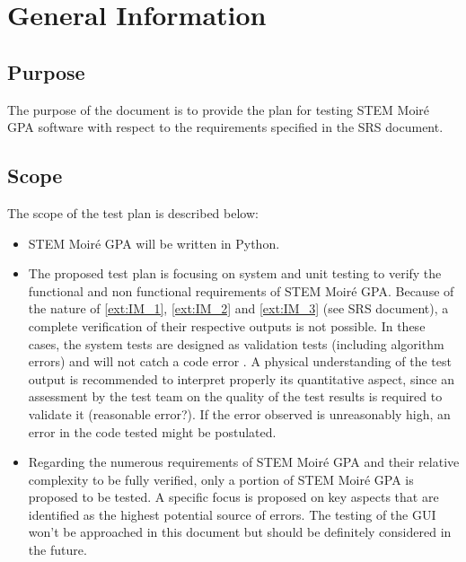 \documentclass[12pt, titlepage]{article}
\newcommand{\progname}{STEM Moir{\'e} GPA}
\begin{document}


\section{General Information}

\subsection{Purpose}

The purpose of the document is to provide the plan for testing
\progname{} software with respect to the requirements specified in the
SRS document.  

\subsection{Scope}

The scope of the test plan is described below:
\begin{itemize}
\item \progname{} will be written in Python.
\item The proposed test plan is focusing on system and unit testing to
  verify the functional and non functional requirements of
  \progname{}. Because of the nature of \cref{ext:IM_1},
  \cref{ext:IM_2} and \cref{ext:IM_3} (see SRS document), a complete
  verification of their respective outputs is not possible. In these
  cases, the system tests are designed as validation tests (including
  algorithm errors) and will not catch a code error . A physical
  understanding of the test output is recommended to interpret
  properly its quantitative aspect, since an assessment by the test
  team on the quality of the test results is required to validate it
  (reasonable error?). If the error observed is unreasonably high, an
  error in the code tested might be postulated.
\item Regarding the numerous requirements of \progname{} and their
  relative complexity to be fully verified, only a portion of
  \progname{} is proposed to be tested. A specific focus is proposed
  on key aspects that are identified as the highest potential source
  of errors. The testing of the GUI won't be approached in this
  document but should be definitely considered in the future.
\end{itemize}
\end{document}
